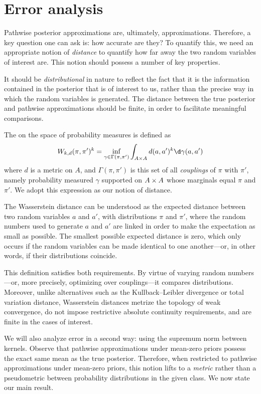 \documentclass[11pt]{book}
\begin{document}
\section{Error analysis}

Pathwise posterior approximations are, ultimately, approximations.
Therefore, a key question one can ask is: how accurate are they?
To quantify this, we need an appropriate notion of \emph{distance} to quantify how far away the two random variables of interest are.
This notion should possess a number of key properties.

\1  It should be \emph{distributional} in nature to reflect the fact that it is the information contained in the posterior that is of interest to us, rather than the precise way in which the random variables is generated.
\2 The distance between the true posterior and pathwise approximations should be finite, in order to facilitate meaningful comparisons.
\0 

The  on the space of probability measures is defined as 
\[
W_{k,d}(\pi,\pi')^k = \inf_{\gamma\in\Gamma(\pi,\pi')} \int_{A\x A} d(a,a')^k \d\gamma(a,a')
\]
where $d$ is a metric on $A$, and $\Gamma(\pi,\pi')$ is this set of all \emph{couplings} of $\pi$ with $\pi'$, namely probability measured $\gamma$ supported on $A\times A$ whose marginals equal $\pi$ and $\pi'$.
We adopt this expression as our notion of distance.

The Wasserstein distance can be understood as the expected distance between two random variables $a$ and $a'$, with distributions $\pi$ and $\pi'$, where the random numbers used to generate $a$ and $a'$ are linked in order to make the expectation as small as possible.
The smallest possible expected distance is zero, which only occurs if the random variables can be made identical to one another---or, in other words, if their distributions coincide.

This definition satisfies both requirements. 
By virtue of varying random numbers---or, more precisely, optimizing over couplings---it compares distributions.
Moreover, unlike alternatives such as the Kullback--Leibler divergence or total variation distance, Wasserstein distances metrize the topology of weak convergence, do not impose restrictive absolute continuity requirements, and are finite in the cases of interest.

We will also analyze error in a second way: using the supremum norm between kernels.
Observe that pathwise approximations under mean-zero priors possess the exact same mean as the true posterior.
Therefore, when restricted to pathwise approximations under mean-zero priors, this notion lifts to a \emph{metric} rather than a pseudometric between probability distributions in the given class.
We now state our main result.
\end{document}
